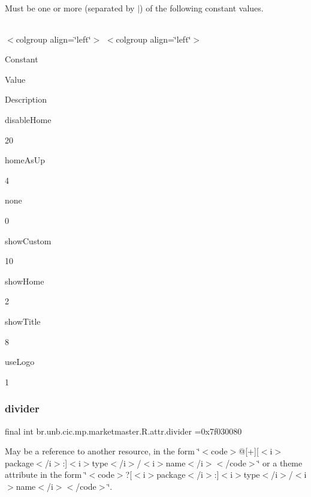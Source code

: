 Must be one or more (separated by \textquotesingle{}$\vert$\textquotesingle{}) of the following constant values.

\tabulinesep=1mm
\begin{longtabu} spread 0pt [c]{*{0}{|X[-1]}|}
\hline
\end{longtabu}
$<$colgroup align=\char`\"{}left\char`\"{}$>$ $<$colgroup align=\char`\"{}left\char`\"{}$>$ 

Constant

Value

Description 

disable\+Home

20

home\+As\+Up

4

none

0

show\+Custom

10

show\+Home

2

show\+Title

8

use\+Logo

1\mbox{\label{classbr_1_1unb_1_1cic_1_1mp_1_1marketmaster_1_1R_1_1attr_a26d3749e17acfc5db45ea5a657f153bb}} 
\subsubsection{\texorpdfstring{divider}{divider}}
{\footnotesize\ttfamily final int br.\+unb.\+cic.\+mp.\+marketmaster.\+R.\+attr.\+divider =0x7f030080\hspace{0.3cm}{\ttfamily [static]}}

May be a reference to another resource, in the form \char`\"{}$<$code$>$@\mbox{[}+\mbox{]}\mbox{[}$<$i$>$package$<$/i$>$\+:\mbox{]}$<$i$>$type$<$/i$>$/$<$i$>$name$<$/i$>$$<$/code$>$\char`\"{} or a theme attribute in the form \char`\"{}$<$code$>$?\mbox{[}$<$i$>$package$<$/i$>$\+:\mbox{]}$<$i$>$type$<$/i$>$/$<$i$>$name$<$/i$>$$<$/code$>$\char`\"{}. \mbox{\label{classbr_1_1unb_1_1cic_1_1mp_1_1marketmaster_1_1R_1_1attr_ab443197f0929bd1c8462c74645cda597}} 

